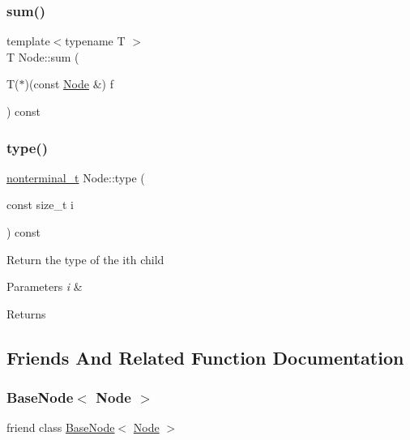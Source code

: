 \subsubsection{\texorpdfstring{sum()}{sum()}\hspace{0.1cm}{\footnotesize\ttfamily [2/2]}}
{\footnotesize\ttfamily template$<$typename T $>$ \\
T Node\+::sum (\begin{DoxyParamCaption}\item[{T($\ast$)(const \hyperlink{class_node}{Node} \&)}]{f }\end{DoxyParamCaption}) const\hspace{0.3cm}{\ttfamily [inline]}}

\mbox{\label{class_node_aa727c354e38f60fb1560d72ae1aaa9af}} 
\subsubsection{\texorpdfstring{type()}{type()}}
{\footnotesize\ttfamily \hyperlink{_nonterminal_8h_a1c5bfe9b903f69c83bbde5da7035fef3}{nonterminal\+\_\+t} Node\+::type (\begin{DoxyParamCaption}\item[{const size\+\_\+t}]{i }\end{DoxyParamCaption}) const\hspace{0.3cm}{\ttfamily [inline]}}

Return the type of the i\textquotesingle{}th child 
\begin{DoxyParams}{Parameters}
{\em i} & \\
\hline
\end{DoxyParams}
\begin{DoxyReturn}{Returns}

\end{DoxyReturn}


\subsection{Friends And Related Function Documentation}
\mbox{\label{class_node_ae875dded1044564c83cdc7147d86dfbf}} 
\subsubsection{\texorpdfstring{Base\+Node$<$ Node $>$}{BaseNode< Node >}}
{\footnotesize\ttfamily friend class \hyperlink{class_base_node}{Base\+Node}$<$ \hyperlink{class_node}{Node} $>$\hspace{0.3cm}{\ttfamily [friend]}}



